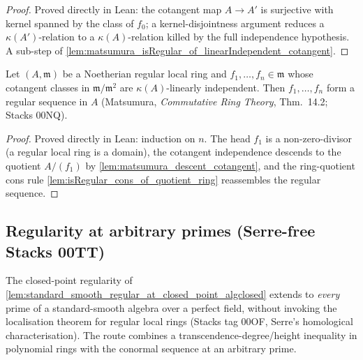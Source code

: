 \begin{proof}
  Proved directly in Lean: the cotangent map \(A \to A'\) is surjective with kernel
  spanned by the class of \(f_0\); a kernel-disjointness argument reduces a
  \(\kappa(A')\)-relation to a \(\kappa(A)\)-relation killed by the full independence
  hypothesis. A sub-step of
  \cref{lem:matsumura_isRegular_of_linearIndependent_cotangent}.
\end{proof}

\begin{lemma}
  \label{lem:matsumura_isRegular_of_linearIndependent_cotangent}
  Let \((A, \mathfrak m)\) be a Noetherian regular local ring and \(f_1,\dots,f_n \in
  \mathfrak m\) whose cotangent classes in \(\mathfrak m/\mathfrak m^2\) are
  \(\kappa(A)\)-linearly independent. Then \(f_1,\dots,f_n\) form a regular sequence in
  \(A\) (Matsumura, \emph{Commutative Ring Theory}, Thm.~14.2; Stacks 00NQ).
\end{lemma}

\begin{proof}
  Proved directly in Lean: induction on \(n\). The head \(f_1\) is a non-zero-divisor
  (a regular local ring is a domain), the cotangent independence descends to the
  quotient \(A/(f_1)\) by \cref{lem:matsumura_descent_cotangent}, and the
  ring-quotient cons rule \cref{lem:isRegular_cons_of_quotient_ring} reassembles the
  regular sequence.
\end{proof}

\subsection{Regularity at arbitrary primes (Serre-free Stacks 00TT)}
\label{subsec:smooth_prime_regularity}

The closed-point regularity of \cref{lem:standard_smooth_regular_at_closed_point_algclosed}
extends to \emph{every} prime of a standard-smooth algebra over a perfect
field, without invoking the localisation theorem for regular local rings
(Stacks tag 00OF, Serre's homological characterisation). The route combines a
transcendence-degree/height inequality in polynomial rings with the conormal
sequence at an arbitrary prime.

